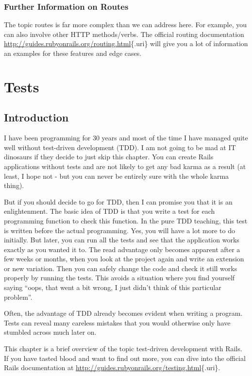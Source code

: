 \documentclass[a4paper]{book}
\newcommand{\chap}[1]{\newpage\thispagestyle{empty}\chapter{#1}\label{chap:\thechapter}}
\begin{document}
\subsection{Further Information on Routes}\label{further-information-on-routes}

The topic routes is far more complex than we can address here. For example, you can also involve other HTTP methods/verbs. The official routing documentation \url{http://guides.rubyonrails.org/routing.html}\{.uri\} will give you a lot of information an examples for these features and edge cases.

\chap{Tests}\label{tests}

\section{Introduction}\label{introduction-3}

I have been programming for 30 years and most of the time I have managed quite well without test-driven development (TDD). I am not going to be mad at IT dinosaurs if they decide to just skip this chapter. You can create Rails applications without tests and are not likely to get any bad karma as a result (at least, I hope not - but you can never be entirely sure with the whole karma thing).

But if you should decide to go for TDD, then I can promise you that it is an enlightenment. The basic idea of TDD is that you write a test for each programming function to check this function. In the pure TDD teaching, this test is written before the actual programming. Yes, you will have a lot more to do initially. But later, you can run all the tests and see that the application works exactly as you wanted it to. The read advantage only becomes apparent after a few weeks or months, when you look at the project again and write an extension or new variation. Then you can safely change the code and check it still works properly by running the tests. This avoids a situation where you find yourself saying “oops, that went a bit wrong, I just didn't think of this particular problem”.

Often, the advantage of TDD already becomes evident when writing a program. Tests can reveal many careless mistakes that you would otherwise only have stumbled across much later on.

This chapter is a brief overview of the topic test-driven development with Rails. If you have tasted blood and want to find out more, you can dive into the official Rails documentation at \url{http://guides.rubyonrails.org/testing.html}\{.uri\}.
\end{document}
